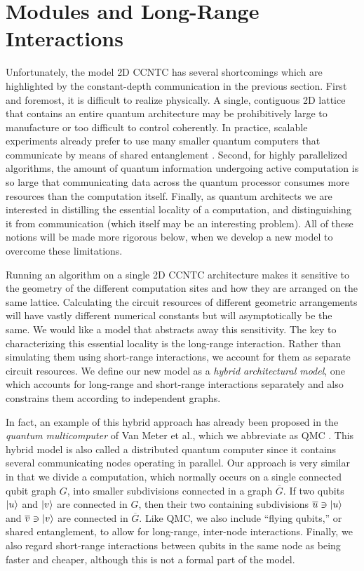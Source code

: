 \section{Modules and Long-Range Interactions}
\label{sec:intro-modules}


Unfortunately, the model \textsf{2D CCNTC} has several shortcomings
which are highlighted by the constant-depth communication in the
previous section. First and foremost, it is difficult to realize physically. 
A single, contiguous
2D lattice that contains an entire quantum architecture
may be prohibitively large to manufacture or too difficult to control
coherently. In practice,
scalable experiments already prefer to use many
smaller quantum computers that communicate by means of shared
entanglement \cite{Monroe2012}. Second, for highly parallelized
algorithms, the amount of quantum information undergoing active
computation is so large that communicating data across the
quantum processor consumes more resources than the computation
itself. Finally, as quantum architects we are interested in distilling
the essential locality of a computation, and distinguishing it from
communication (which itself may be an interesting problem). All of these
notions will be made more rigorous below, when we develop a new model to
overcome these limitations.

Running an
algorithm on a single \textsf{2D CCNTC} architecture makes it
sensitive to the geometry of the different computation sites and how they
are arranged on the same lattice. Calculating the circuit resources of different
geometric arrangements will have vastly different numerical constants but will asymptotically
be the same. We would like a model that abstracts away this sensitivity.
The key to characterizing this essential locality is the long-range interaction. Rather than simulating them using short-range interactions,
we account for them as separate circuit resources. We define our
new model as a
\emph{hybrid architectural model}, one which accounts for long-range
and short-range interactions separately and also constrains them
according to independent graphs.

In fact, an example of this hybrid approach has already been proposed
in the \emph{quantum multicomputer} of Van Meter et al.,
which we abbreviate as \textsf{QMC} \cite{VanMeter2008}.
This hybrid model is also called a distributed quantum computer since it contains several communicating nodes operating in parallel.
Our approach is
very similar in that we divide a computation, which normally occurs on a single connected qubit graph $G$, into smaller subdivisions connected in
a graph $\overline{G}$. If two qubits $\left\vert{u}\right\rangle$ and $\left\vert{v}\right\rangle$ are connected
in $G$, then their two containing subdivisions $\overline{u} \ni \left\vert{u}\right\rangle$
and $\overline{v} \ni \left\vert{v}\right\rangle$ are connected in $\overline{G}$.
Like \textsf{QMC}, we also include ``flying qubits,'' or shared
entanglement, to allow for long-range, inter-node interactions.
Finally, we also regard short-range interactions between
qubits in the same node as being faster and cheaper, although this is not
a formal part of the model.


